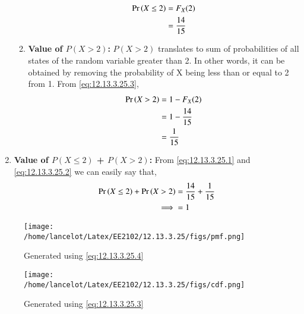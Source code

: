 \documentclass[journal,12pt,twocolumn]{IEEEtran}
\theoremstyle{remark}
\begin{document}
\begin{enumerate}
\begin{enumerate}
	\begin{align}
	\Pr\left(X \le 2\right) &= F_{X}(2)\\
	 &= \frac{14}{15} \label{eq:12.13.3.25.1}
	\end{align}
	\item \textbf{Value of $P(X > 2)$:} $P(X > 2)$ translates to sum of probabilities of all states of the random variable greater than 2. In other words, it can be obtained by removing the probability of X being less than or equal to 2 from 1. From \eqref{eq:12.13.3.25.3},
	\begin{align}
	\Pr\left(X > 2\right) &= 1 - F_{X}(2)\\
	 &= 1 - \frac{14}{15} \\
	 &= \frac{1}{15}  \label{eq:12.13.3.25.2}
	\end{align}
	\end{enumerate}
\item \textbf{Value of $P(X \le 2)$ + $P(X > 2)$:} From \eqref{eq:12.13.3.25.1} and \eqref{eq:12.13.3.25.2} we can easily say that,
\begin{align}
	\Pr\left(X \le 2\right) + \Pr\left(X > 2\right) &= \frac{14}{15} + \frac{1}{15}\\
	\implies &= 1
\end{align}
\end{enumerate}
\begin{figure}
	\centering
	\texttt{[image: /home/lancelot/Latex/EE2102/12.13.3.25/figs/pmf.png]}
	\caption{Generated using \eqref{eq:12.13.3.25.4}}
	\label{fig:PMF of X}
\end{figure}
\begin{figure}
	\centering
	\texttt{[image: /home/lancelot/Latex/EE2102/12.13.3.25/figs/cdf.png]}
	\caption{Generated using \eqref{eq:12.13.3.25.3}}
	\label{fig:CDF of X}
\end{figure}
\end{document}
